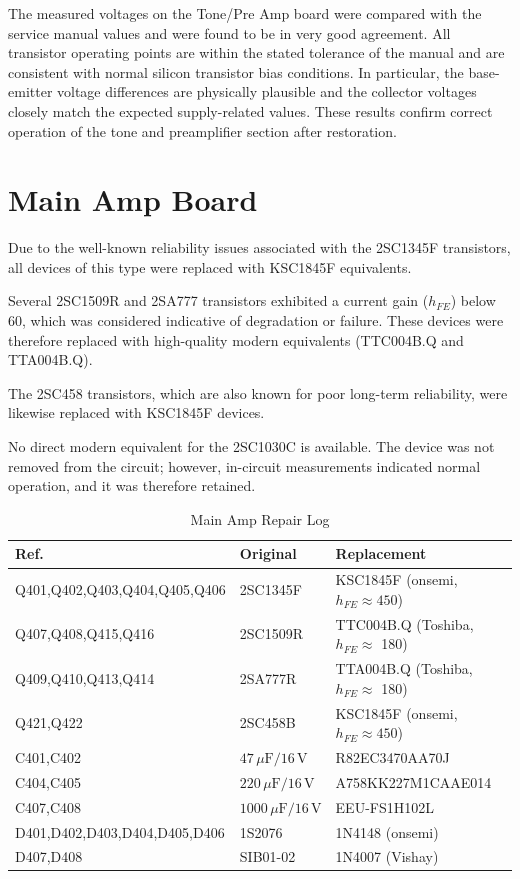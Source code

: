 \documentclass[]{article}
\begin{document}
The measured voltages on the Tone/Pre Amp board were compared with the service manual values and were found to be in very good agreement. All transistor operating points are within the stated tolerance of the manual and are consistent with normal silicon transistor bias conditions. In particular, the base-emitter voltage differences are physically plausible and the collector voltages closely match the expected supply-related values. These results confirm correct operation of the tone and preamplifier section after restoration.

\section{Main Amp Board}

Due to the well-known reliability issues associated with the 2SC1345F transistors, all devices of this type were replaced with KSC1845F equivalents.

Several 2SC1509R and 2SA777 transistors exhibited a current gain ($h_{FE}$) below 60, which was considered indicative of degradation or failure. These devices were therefore replaced with high-quality modern equivalents (TTC004B.Q and TTA004B.Q).

The 2SC458 transistors, which are also known for poor long-term reliability, were likewise replaced with KSC1845F devices.

No direct modern equivalent for the 2SC1030C is available. The device was not removed from the circuit; however, in-circuit measurements indicated normal operation, and it was therefore retained.

\begin{table}[H]
	\centering
	\caption{Main Amp Repair Log}
	\label{tab:main_amp_log}
	\begin{tabular}{|l|l|l|}
		\hline
		\textbf{Ref.} & \textbf{Original} & \textbf{Replacement} \\
		\hline
		Q401,Q402,Q403,Q404,Q405,Q406 & 2SC1345F & KSC1845F (onsemi, $h_{FE} \approx 450$) \\
        \hline
        Q407,Q408,Q415,Q416 & 2SC1509R & TTC004B.Q (Toshiba, $h_{FE} \approx$ 180) \\
        \hline
        Q409,Q410,Q413,Q414 & 2SA777R & TTA004B.Q (Toshiba, $h_{FE} \approx$ 180)\\
        \hline
        Q421,Q422 & 2SC458B & KSC1845F (onsemi, $h_{FE} \approx 450$)\\
        \hline
        C401,C402 & $47\,\mu\mathrm{F} / 16\,\mathrm{V}$ & R82EC3470AA70J  \\
        \hline
        C404,C405 & $220\,\mu\mathrm{F} / 16\,\mathrm{V}$  & A758KK227M1CAAE014 \\
        \hline
        C407,C408 & $1000\,\mu\mathrm{F} / 16\,\mathrm{V}$ & EEU-FS1H102L \\
        \hline
        D401,D402,D403,D404,D405,D406 & 1S2076 & 1N4148 (onsemi) \\
        \hline
        D407,D408 & SIB01-02 & 1N4007 (Vishay) \\
        \hline
	\end{tabular}
\end{table}
\end{document}
